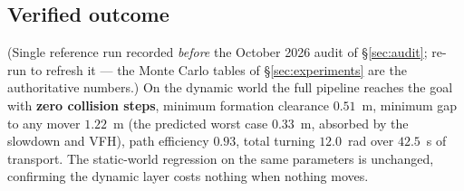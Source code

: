 \subsection{Verified outcome}

(Single reference run recorded \emph{before} the October 2026 audit of
\S\ref{sec:audit}; re-run  to refresh it --- the
Monte Carlo tables of \S\ref{sec:experiments} are the authoritative
numbers.) On the dynamic world the full pipeline reaches the goal with
\textbf{zero collision steps}, minimum formation clearance $0.51$~m, minimum
gap to any mover $1.22$~m (the predicted worst case $0.33$~m, absorbed by the
slowdown and VFH), path efficiency $0.93$, total turning $12.0$~rad over
$42.5$~s of transport. The static-world regression on the same parameters is
unchanged, confirming the dynamic layer costs nothing when nothing moves.
